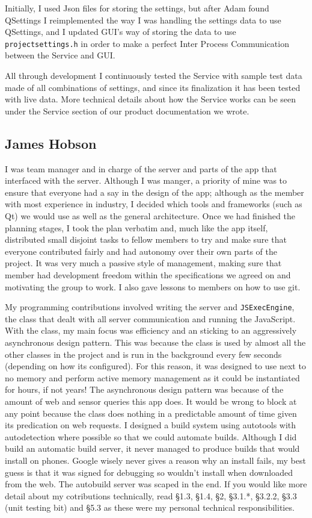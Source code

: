 \documentclass{article}
\begin{document}
Initially, I used Json files for storing the settings, but after Adam found QSettings I reimplemented the way I was handling the settings data to use QSettings, and I updated GUI's way of storing the data to use \texttt{projectsettings.h} in order to make a perfect Inter Process Communication between the Service and GUI.

All through development I continuously tested the Service with sample test data made of all combinations of settings, and since its finalization it has been tested with live data. More technical details about how the Service works can be seen under the Service section of our product documentation we wrote.

\subsection{James Hobson}
I was team manager and in charge of the server and parts of the app that interfaced with the server. Although I was manger, a priority of mine
was to ensure that everyone had a say in the design of the app; although as the member with most experience in industry, I decided which tools
and frameworks (such as Qt) we would use as well as the general architecture. Once we had finished the planning stages, I took the plan verbatim and,
much like the app itself, distributed small disjoint tasks to fellow members to try and make sure that everyone contributed fairly
and had autonomy over their own parts of the project. It was very much a passive style of management, making sure that member had development freedom
within the specifications we agreed on and motivating the group to work. I also gave lessons to members on how to use git.

My programming contributions involved writing the server and \texttt{JSExecEngine}, the class that dealt with all server communication and
running the JavaScript. With the class, my main focus was efficiency and an sticking to an aggressively asynchronous design pattern. This was
because the class is used by almost all the other classes in the project and is run in the background every few seconds (depending on how its configured).
For this reason, it was designed to use next to no memory and perform active memory management as it could be instantiated for hours, if not years!
The asynchronous design pattern was because of the amount of web and sensor queries this app does. It would be wrong to block at any point because
the class does nothing in a predictable amount of time given its predication on web requests. I designed a build system using autotools
with autodetection where possible so that we could automate builds. Although I did build an automatic build server, it never managed to 
produce builds that would install on phones. Google wisely never gives a reason why an install fails, my best guess is that it was signed for debugging
so wouldn't install when downloaded from the web. The autobuild server was scaped in the end. If you would like more detail about my cotributions
technically, read §1.3, §1.4, §2, §3.1.*, §3.2.2, §3.3 (unit testing bit) and §5.3 as these were my personal technical responsibilities.
\end{document}
